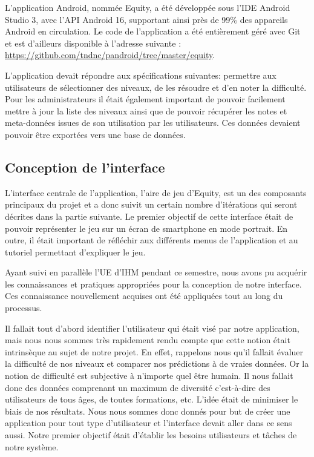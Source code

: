 \documentclass[../main.tex]{subfiles}
\begin{document}
	L'application Android, nommée Equity, a été développée sous l'IDE Android Studio 3, avec l'API Android 16, supportant ainsi près de 99\% des appareils Android en circulation. Le code de l'application a été entièrement géré avec Git et est d'ailleurs disponible à l'adresse suivante : \url{https://github.com/tndnc/pandroid/tree/master/equity}. 
	
	L'application devait répondre aux spécifications suivantes: permettre aux utilisateurs de sélectionner des niveaux, de les résoudre et d'en noter la difficulté. Pour les administrateurs il était également important de pouvoir facilement mettre à jour la liste des niveaux ainsi que de pouvoir récupérer les notes et meta-données issues de son utilisation par les utilisateurs. Ces données devaient pouvoir être exportées vers une base de données.
	
	\subsection{Conception de l'interface}
	
L'interface centrale de l'application, l'aire de jeu d'Equity, est un des composants principaux du projet et a donc suivit un certain nombre d'itérations qui seront décrites dans la partie suivante. Le premier objectif de cette interface était de pouvoir représenter le jeu sur un écran de smartphone en mode portrait. En outre, il était important de réfléchir aux différents menus de l'application et au tutoriel permettant d'expliquer le jeu.

Ayant suivi en parallèle l'UE d'IHM pendant ce semestre, nous avons pu acquérir les connaissances et pratiques appropriées pour la conception de notre interface. Ces connaissance nouvellement acquises ont été appliquées tout au long du processus.

Il fallait tout d'abord identifier l'utilisateur qui était visé par notre application, mais nous nous sommes très rapidement rendu compte que cette notion était intrinsèque au sujet de notre projet. En effet, rappelons nous qu'il fallait évaluer la difficulté de nos niveaux et comparer nos prédictions à de vraies données. Or la notion de difficulté est subjective à n'importe quel être humain. Il nous fallait donc des données comprenant un maximum de diversité c'est-à-dire des utilisateurs de tous âges, de toutes formations, etc. L'idée était de minimiser le biais de nos résultats. Nous nous sommes donc donnés pour but de créer une application pour tout type d'utilisateur et l'interface devait aller dans ce sens aussi. Notre premier objectif était d'établir les besoins utilisateurs et tâches de notre système.
\end{document}
